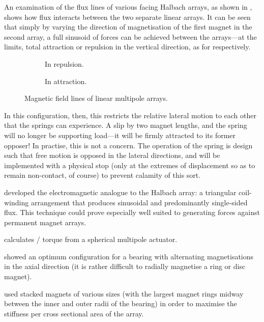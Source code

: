 \documentclass[11pt,a4paper]{memoir}
\begin{document}
An examination of the flux lines of various facing Halbach arrays, as shown in
, shows how flux interacts between
the two separate linear arrays. It can be seen that simply by varying the
direction of magnetisation of the first magnet in the second array, a full
sinusoid of forces can be achieved between the arrays—at the limits, total
attraction or repulsion in the vertical direction, as for
 respectively.

\begin{figure}
  \begin{subfigure}
  \caption{In repulsion.}
\end{subfigure}
\begin{subfigure}
  \caption{In attraction.}
\end{subfigure}
\caption{Magnetic field lines of linear multipole arrays.}
\end{figure}

In this configuration, then, this restricts the relative lateral motion to
each other that the springs can experience. A slip by two magnet lengths, and
the spring will no longer be supporting load---it will be firmly attracted to
its former opposer! In practise, this is not a concern. The operation of the
spring is design such that free motion is opposed in the lateral directions,
and will be implemented with a physical stop (only at the extremes of
displacement so as to remain non-contact, of course) to prevent calamity of
this sort.




\textcite{trumper1996} developed the electromagnetic analogue to the
Halbach array: a triangular coil-winding arrangement that produces
sinusoidal and predominantly single-sided flux. This technique could
prove especially well suited to generating forces against permanent
magnet arrays.

\textcite{xia2008-ietm} calculates \threeD/ torque from a spherical multipole actuator.


\textcite{moser2006} showed an optimum configuration for a bearing
with alternating magnetisations in the axial direction (it is rather
difficult to radially magnetise a ring or disc magnet).

\textcite{chen2002} used stacked magnets of various sizes (with the
largest magnet rings midway between the inner and outer radii of the
bearing) in order to maximise the stiffness per cross sectional area of the
array.
\end{document}
